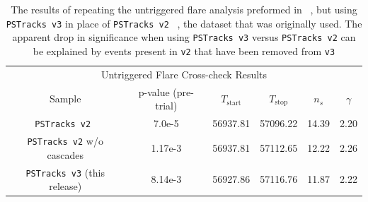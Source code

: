 \documentclass[aps,10pt,prd,twocolumn,floats,letterpaper,showpacs,nofootinbib,bibnotes,notitlepage,superscriptaddress,floatfix]{revtex4-1}
\newcommand{\MA}[1]{{\color{black}#1}}
\begin{document}
\begin{table}[p]
\centering
\begin{ruledtabular}
\begin{tabular}{cccccc}
\multicolumn{6}{c}{Untriggered Flare Cross-check Results} \\[0.1cm]
Sample & p-value (pre-trial) & $T_\text{start}$ & $T_\text{stop}$ & $n_s$ & $\gamma$ \\ 
\MA{\tt PSTracks v2}~\cite{IceCube:2018cha,IceCube:2019} & 7.0e-5 & 56937.81 & 57096.22 & 14.39 & 2.20  \\
\MA{\tt PSTracks v2} w/o cascades & 1.17e-3 & 56937.81 & 57112.65 & 12.22 & 2.26 \\
\MA{\tt PSTracks v3} (this release) & 8.14e-3 & 56927.86 & 57116.76 & 11.87 & 2.22\\
\end{tabular}
\end{ruledtabular}
\caption[]{The results of repeating the untriggered flare analysis preformed in ~\cite{IceCube:2018cha}, but using {\tt PSTracks v3} in place of {\tt PSTracks v2} ~\cite{IceCube:2019}, the dataset that was originally used. The apparent drop in significance when using {\tt PSTracks v3} versus {\tt PSTracks v2} can be explained by events present in {\tt v2} that have been removed from {\tt v3}}\label{tab:TXSCrossChecks}
\end{table}
\end{document}
